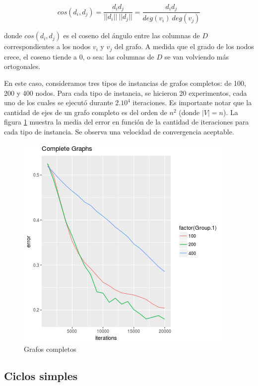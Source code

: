 \documentclass[10pt, a4paper, twocolumn]{article} %
\begin{document}
$$cos(d_i,d_j) = \frac{d_i d_j}{||d_i|| \ ||d_j||} = 
\frac{d_i d_j}{deg(v_i) \ deg(v_j)}$$

donde $cos(d_i,d_j)$ es el coseno del ángulo entre las columnas de $D$ 
correspondientes a los nodos $v_i$ y $v_j$ del grafo. A medida que el 
grado de los nodos crece, el coseno tiende a $0$, o sea: las columnas 
de $D$ se van volviendo más ortogonales.

\smallskip

En este caso, consideramos tres tipos de instancias de grafos 
completos: de 100, 200 y 400 nodos. Para cada tipo de instancia, se 
hicieron 20 experimentos, cada uno de los cuales se ejecutó durante 
$2 . 10^4$ iteraciones. Es importante notar que la cantidad de ejes de 
un grafo completo es del orden de $n^2$ (donde $|V| = n$).  La figura 
\ref{fig:complete} muestra la media del error en función de la cantidad 
de iteraciones para cada tipo de instancia. Se observa una velocidad de 
convergencia aceptable.


\begin{figure}
	\includegraphics[width=\linewidth]{complete_graphs.png} %
	\caption{Grafos completos} %
	\label{fig:complete} %
\end{figure}

\subsection{Ciclos simples}
\end{document}
